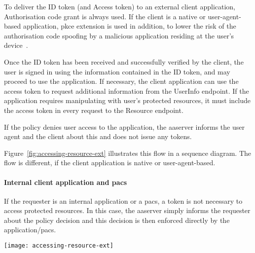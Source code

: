 To deliver the ID token (and Access token) to an external client application, Authorisation code grant is always used. If the client is a native or user-agent-based application, \acrshort{pkce} extension is used in addition, to lower the risk of the authorisation code spoofing by a malicious application residing at the user's device~\cite{Sakimura2015ProofClients}.

Once the ID token has been received and successfully verified by the client, the user is signed in using the information contained in the ID token, and may proceed to use the application. If necessary, the client application can use the access token to request additional information from the UserInfo endpoint. If the application requires manipulating with user's protected resources, it must include the access token in every request to the Resource endpoint.

If the policy denies user access to the application, the \acrshort{aaserver} informs the user agent and the client about this and does not issue any tokens.

Figure~\ref{fig:accessing-resource-ext} illustrates this flow in a sequence diagram. The flow is different, if the client application is native or user-agent-based.

\paragraph{Internal client application and \acrshort{pacs}}
If the requester is an internal application or a \acrshort{pacs}, a token is not necessary to access protected resources. In this case, the \acrshort{aaserver} simply informs the requester about the policy decision and this decision is then enforced directly by the application/\acrshort{pacs}.


\begin{sidewaysfigure}[p]
    \centering
    \texttt{[image: accessing-resource-ext]}
    \caption{Sign-in and access token issuance process to external server-based client application.}
    \label{fig:accessing-resource-ext}
\end{sidewaysfigure}
\restoregeometry

